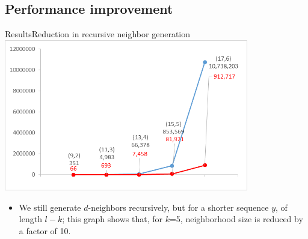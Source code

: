 \documentclass[pdf,xcolor={dvipsnames}]{beamer}
\begin{document}
	\subsection{Performance improvement}
	\begin{frame}{Results}{Reduction in recursive neighbor generation} %
		{\centering\includegraphics[width=0.8\textwidth]{img/nbrhd_growth_compare.png}\\}
		\begin{itemize}
		\item We still generate $d$-neighbors recursively, but for a shorter sequence $y$, of length $l-k$;
		this graph shows that, for $k$=5, neighborhood size is reduced by a factor of 10.
		\end{itemize}
		\end{frame}
\end{document}

